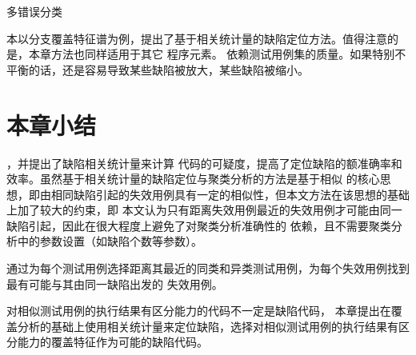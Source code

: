 多错误分类

本以分支覆盖特征谱为例，提出了基于相关统计量的缺陷定位方法。值得注意的是，本章方法也同样适用于其它
程序元素。
依赖测试用例集的质量。如果特别不平衡的话，还是容易导致某些缺陷被放大，某些缺陷被缩小。
\section{本章小结}
，并提出了缺陷相关统计量来计算
代码的可疑度，提高了定位缺陷的额准确率和效率。虽然基于相关统计量的缺陷定位与聚类分析的方法是基于相似
的核心思想，即由相同缺陷引起的失效用例具有一定的相似性，但本文方法在该思想的基础上加了较大的约束，即
本文认为只有距离失效用例最近的失效用例才可能由同一缺陷引起，因此在很大程度上避免了对聚类分析准确性的
依赖，且不需要聚类分析中的参数设置（如缺陷个数等参数）。

通过为每个测试用例选择距离其最近的同类和异类测试用例，为每个失效用例找到最有可能与其由同一缺陷出发的
失效用例。

对相似测试用例的执行结果有区分能力的代码不一定是缺陷代码，
本章提出在覆盖分析的基础上使用相关统计量来定位缺陷，选择对相似测试用例的执行结果有区分能力的覆盖特征作为可能的缺陷代码。

